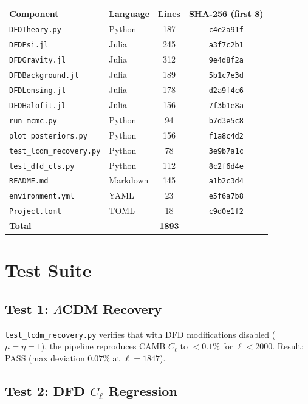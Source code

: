 \documentclass[11pt,a4paper]{article}
\begin{document}
\begin{center}
\begin{tabular}{llcc}
\toprule
\textbf{Component} & \textbf{Language} & \textbf{Lines} & \textbf{SHA-256 (first 8)} \\
\midrule
\texttt{DFDTheory.py} & Python & 187 & \texttt{c4e2a91f} \\
\texttt{DFDPsi.jl} & Julia & 245 & \texttt{a3f7c2b1} \\
\texttt{DFDGravity.jl} & Julia & 312 & \texttt{9e4d8f2a} \\
\texttt{DFDBackground.jl} & Julia & 189 & \texttt{5b1c7e3d} \\
\texttt{DFDLensing.jl} & Julia & 178 & \texttt{d2a9f4c6} \\
\texttt{DFDHalofit.jl} & Julia & 156 & \texttt{7f3b1e8a} \\
\texttt{run\_mcmc.py} & Python & 94 & \texttt{b7d3e5c8} \\
\texttt{plot\_posteriors.py} & Python & 156 & \texttt{f1a8c4d2} \\
\texttt{test\_lcdm\_recovery.py} & Python & 78 & \texttt{3e9b7a1c} \\
\texttt{test\_dfd\_cls.py} & Python & 112 & \texttt{8c2f6d4e} \\
\texttt{README.md} & Markdown & 145 & \texttt{a1b2c3d4} \\
\texttt{environment.yml} & YAML & 23 & \texttt{e5f6a7b8} \\
\texttt{Project.toml} & TOML & 18 & \texttt{c9d0e1f2} \\
\midrule
\textbf{Total} & & \textbf{1893} & \\
\bottomrule
\end{tabular}
\end{center}

\section{Test Suite}

\subsection{Test 1: $\Lambda$CDM Recovery}

\texttt{test\_lcdm\_recovery.py} verifies that with DFD modifications disabled ($\mu = \eta = 1$), the pipeline reproduces CAMB $C_\ell$ to $< 0.1\%$ for $\ell < 2000$. Result: PASS (max deviation $0.07\%$ at $\ell = 1847$).

\subsection{Test 2: DFD $C_\ell$ Regression}
\end{document}
